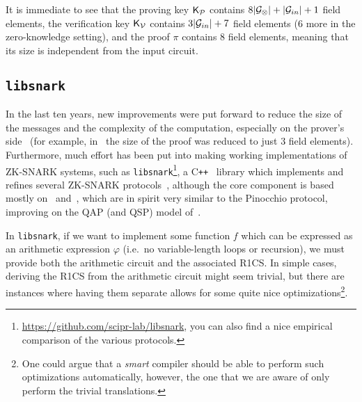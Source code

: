 It is immediate to see that the proving key \(\mathsf{K}_\mathcal{P} \) contains 
\(8\abs{\mathcal{G}_{\otimes}} + \abs{\mathcal{G}_{in}} + 1\) field elements, the verification 
key \(\mathsf{K}_\mathcal{V} \) contains \(3\abs{\mathcal{G}_{in}} + 7\) field elements (\(6\) more in the 
zero-knowledge setting), and the proof \(\pi \) contains \(8\) field elements, meaning that its size
is independent from the input circuit.

\subsection{\texttt{libsnark}}
In the last ten years, new improvements were put forward to reduce the size of the messages and 
the complexity of the computation, especially on the prover's side~\cite{Lipmaa2013} (for example, 
in~\cite{Groth2016} the size of the proof was reduced to just \(3\) field elements).
Furthermore, much effort has been put into making working implementations of ZK-SNARK 
systems, such as \texttt{libsnark}\footnote{\url{https://github.com/scipr-lab/libsnark}, you can also find 
a nice empirical comparison of the various protocols.}, a
C\texttt{++}~\cite{Stroustrup2013} library which implements and refines several ZK-SNARK 
protocols~\cite{DanezisFGK2014,GrothM2017,BackesBFR2014}, although the core component is based 
mostly on~\cite{SassonCTV2013,SassonCGTV2013} and~\cite{Groth2016}, which are in spirit very 
similar to the Pinocchio protocol, improving on the QAP (and QSP) model 
of~\cite{GennaroGPR2012}.

In \texttt{libsnark}, if we want to implement some function \(f\) which can be expressed as an 
arithmetic expression \(\varphi \) (i.e.\ no variable-length loops or recursion), we must provide 
both the arithmetic circuit and the associated R1CS\@.
In simple cases, deriving the R1CS from the arithmetic circuit might seem trivial, but there are 
instances where having them separate allows for some quite nice optimizations\footnote{One could 
argue that a \emph{smart} compiler should be able to perform such optimizations automatically, 
however, the one that we are aware of only perform the trivial translations.}.

